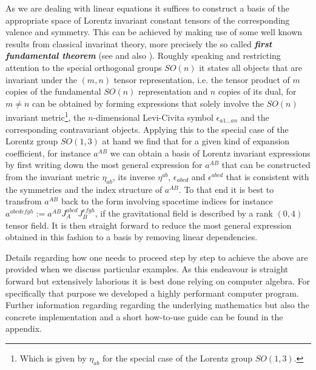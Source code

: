\documentclass[a4paper,12pt, DIV=14, BCOR=5mm, twoside, headsepline]{scrbook}
\begin{document}
As we are dealing with linear equations it suffices to construct a basis of the appropriate space of Lorentz invariant constant tensors of the corresponding valence and symmetry. This can be achieved by making use of some well known results from classical invarinat theory, more precisely the so called \textit{\textbf{first fundamental theorem}} (see \cite{Aslaksen1995InvariantTO} and also \cite{PROCESI1976306}). Roughly speaking and restricting attention to the special orthogonal groups $SO(n)$ it states all objects that are invariant under the $(m,n)$ tensor representation, i.e. the tensor product of $m$ copies of the fundamental $SO(n)$ representation and $n$ copies of its dual, for $m \neq n$ can be obtained by forming expressions that solely involve the $SO(n)$ invariant metric\footnote{Which is given by $\eta_{ab}$ for the special case of the Lorentz group $SO(1,3)$.}, the $n$-dimensional Levi-Civita symbol $\epsilon_{a1...an}$ and the corresponding contravariant objects. Applying this to the special case of the Lorentz group $SO(1,3)$ at hand we find that for a given kind of expansion coefficient, for instance $a^{AB}$ we can obtain a basis of Lorentz invariant expressions by first writing down the most general expression for $a^{AB}$ that can be constructed from the invariant metric $\eta_{ab}$, its inverse $\eta^{ab}$, $\epsilon_{abcd}$ and $\epsilon^{abcd}$ that is consistent with the symmetries and the index structure of $a^{AB}$. To that end it is best to transfrom $a^{AB}$ back to the form involving spacetime indices for instance $a^{abcdefgh} := a^{AB}J_A^{abcd}J_B^{efgh}$, if the gravitational field is described by a rank $(0,4)$ tensor field. It is then straight forward to reduce the most general expression obtained in this fashion to a basis by removing linear dependencies.

Details regarding how one needs to proceed step by step to achieve the above are provided when we discuss particular examples. As this endeavour is straight forward but extensively laborious it is best done relying on computer algebra. For specifically that purpose we developed a highly performant computer program. 
Further information regarding regarding the underlying mathematics but also the concrete implementation and a short how-to-use guide can be found in the appendix. \\
\end{document}
